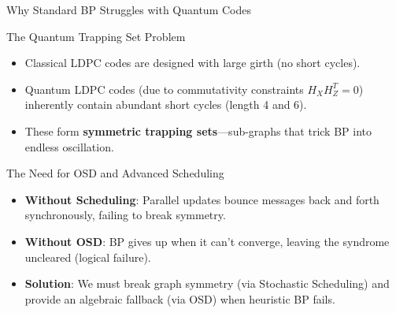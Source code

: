 \begin{frame}{Why Standard BP Struggles with Quantum Codes}
    \begin{block}{The Quantum Trapping Set Problem}
        \begin{itemize}
            \item Classical LDPC codes are designed with large girth (no short cycles).
            \item Quantum LDPC codes (due to commutativity constraints $H_X H_Z^T = 0$) inherently contain abundant short cycles (length 4 and 6).
            \item These form \textbf{symmetric trapping sets}—sub-graphs that trick BP into endless oscillation.
        \end{itemize}
    \end{block}
    
    \begin{block}{The Need for OSD and Advanced Scheduling}
        \begin{itemize}
            \item \textbf{Without Scheduling}: Parallel updates bounce messages back and forth synchronously, failing to break symmetry.
            \item \textbf{Without OSD}: BP gives up when it can't converge, leaving the syndrome uncleared (logical failure).
            \item \textbf{Solution}: We must break graph symmetry (via Stochastic Scheduling) and provide an algebraic fallback (via OSD) when heuristic BP fails.
        \end{itemize}
    \end{block}
\end{frame}
